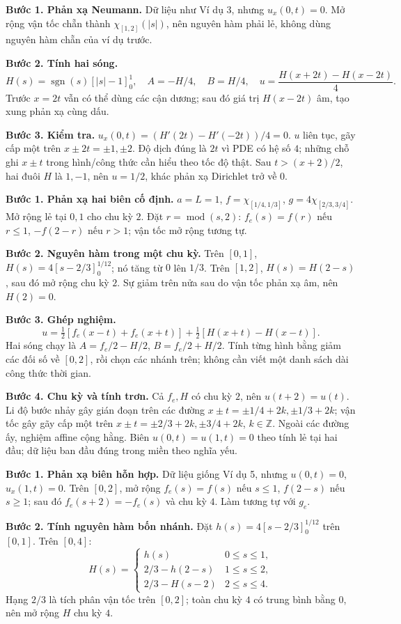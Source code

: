 \textbf{Bước 1. Phản xạ Neumann.} Dữ liệu như Ví dụ 3, nhưng $u_x(0,t)=0$. Mở rộng vận tốc chẵn thành $\chi_{[1,2]}(|s|)$, nên nguyên hàm phải lẻ, không dùng nguyên hàm chẵn của ví dụ trước.

\textbf{Bước 2. Tính hai sóng.}
\[H(s)=\operatorname{sgn}(s)[|s|-1]_0^1,\quad A=-H/4,\quad B=H/4,\quad u=\frac{H(x+2t)-H(x-2t)}4.\]
Trước $x=2t$ vẫn có thể dùng các cận dương; sau đó giá trị $H(x-2t)$ âm, tạo xung phản xạ cùng dấu.

\textbf{Bước 3. Kiểm tra.} $u_x(0,t)=(H'(2t)-H'(-2t))/4=0$. $u$ liên tục, gãy cấp một trên $x\pm2t=\pm1,\pm2$. Độ dịch đúng là $2t$ vì PDE có hệ số $4$; những chỗ ghi $x\pm t$ trong hình/công thức cần hiểu theo tốc độ thật. Sau $t>(x+2)/2$, hai đuôi $H$ là $1,-1$, nên $u=1/2$, khác phản xạ Dirichlet trở về $0$.

\textbf{Bước 1. Phản xạ hai biên cố định.} $a=L=1$, $f=\chi_{[1/4,1/3]}$, $g=4\chi_{[2/3,3/4]}$. Mở rộng lẻ tại $0,1$ cho chu kỳ $2$. Đặt $r=\operatorname{mod}(s,2)$: $f_e(s)=f(r)$ nếu $r\le1$, $-f(2-r)$ nếu $r>1$; vận tốc mở rộng tương tự.

\textbf{Bước 2. Nguyên hàm trong một chu kỳ.} Trên $[0,1]$, $H(s)=4[s-2/3]_0^{1/12}$; nó tăng từ $0$ lên $1/3$. Trên $[1,2]$, $H(s)=H(2-s)$, sau đó mở rộng chu kỳ $2$. Sự giảm trên nửa sau do vận tốc phản xạ âm, nên $H(2)=0$.

\textbf{Bước 3. Ghép nghiệm.}
\[u=\tfrac12[f_e(x-t)+f_e(x+t)]+\tfrac12[H(x+t)-H(x-t)].\]
Hai sóng chạy là $A=f_e/2-H/2$, $B=f_e/2+H/2$. Tính từng hình bằng giảm các đối số về $[0,2]$, rồi chọn các nhánh trên; không cần viết một danh sách dài công thức thời gian.

\textbf{Bước 4. Chu kỳ và tính trơn.} Cả $f_e,H$ có chu kỳ $2$, nên $u(t+2)=u(t)$. Li độ bước nhảy gây gián đoạn trên các đường $x\pm t=\pm1/4+2k,\pm1/3+2k$; vận tốc gây gãy cấp một trên $x\pm t=\pm2/3+2k,\pm3/4+2k$, $k\in\mathbb Z$. Ngoài các đường ấy, nghiệm affine cộng hằng. Biên $u(0,t)=u(1,t)=0$ theo tính lẻ tại hai đầu; dữ liệu ban đầu đúng trong miền theo nghĩa yếu.

\textbf{Bước 1. Phản xạ biên hỗn hợp.} Dữ liệu giống Ví dụ 5, nhưng $u(0,t)=0$, $u_x(1,t)=0$. Trên $[0,2]$, mở rộng $f_e(s)=f(s)$ nếu $s\le1$, $f(2-s)$ nếu $s\ge1$; sau đó $f_e(s+2)=-f_e(s)$ và chu kỳ $4$. Làm tương tự với $g_e$.

\textbf{Bước 2. Tính nguyên hàm bốn nhánh.} Đặt $h(s)=4[s-2/3]_0^{1/12}$ trên $[0,1]$. Trên $[0,4]$:
\[H(s)=\begin{cases}h(s)&0\le s\le1,\\2/3-h(2-s)&1\le s\le2,\\2/3-H(s-2)&2\le s\le4.\end{cases}\]
Hạng $2/3$ là tích phân vận tốc trên $[0,2]$; toàn chu kỳ $4$ có trung bình bằng $0$, nên mở rộng $H$ chu kỳ $4$.

